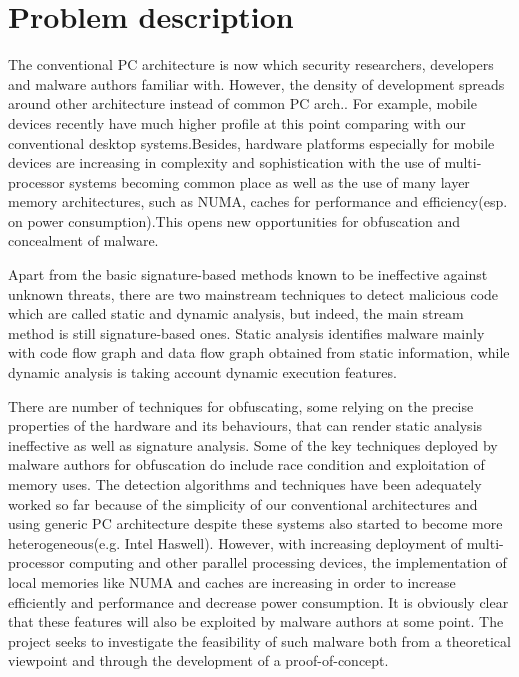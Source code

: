 \section{Problem description}
The conventional PC architecture is now which security researchers, developers and malware authors familiar with. However, the density of development spreads around other architecture instead of common PC arch.. For example, mobile devices recently have much higher profile at this point comparing with our conventional desktop systems.Besides, hardware platforms especially for mobile devices are increasing in complexity and sophistication with the use of multi-processor systems becoming common place as well as the use of many layer  memory architectures, such as NUMA, caches for performance and efficiency(esp. on power consumption).This opens new opportunities for obfuscation and concealment of malware.

Apart from the basic signature-based methods known to be ineffective against unknown threats, there are two mainstream techniques to detect malicious code which are called static and dynamic analysis, but indeed, the main stream method is still signature-based ones. Static analysis identifies malware mainly with code flow graph and data flow graph obtained from static information, while dynamic analysis is taking account dynamic execution features. 

There are number of techniques for obfuscating, some relying on the precise properties of the hardware and its behaviours, that can render static analysis ineffective as well as signature analysis. Some of the key techniques deployed by malware authors for obfuscation do include race condition and exploitation of memory uses. The detection algorithms and techniques have been adequately worked so far because of the simplicity of our conventional architectures and using generic PC architecture despite these systems also started to become more heterogeneous(e.g. Intel Haswell). However, with increasing deployment of multi-processor computing and other parallel processing devices, the implementation of local memories like NUMA and caches are increasing in order to increase efficiently and performance and decrease power consumption. It is obviously clear that these features will also be exploited by malware authors at some point. The project seeks to investigate the feasibility of such malware both from a theoretical viewpoint and through the development of a proof-of-concept.

